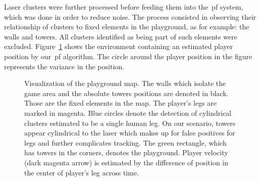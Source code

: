 Laser clusters were further processed before feeding them into the~\gls{pf} system, which was done in order to reduce noise. The process consisted in observing their relationship of clusters to fixed elements in the playground, as for example: the walls and towers. All clusters identified as being part of such elements were excluded. Figure~\ref{fig:laser_tracking} shows the environment containing an estimated player position by our~\gls{pf} algorithm. The circle around the player position in the figure represents the variance in the position.

\begin{figure}[h]
    \centering 
    \caption{Visualization of the playground map. The walls which isolate the game area and the absolute towers positions are denoted in black. Those are the fixed elements in the map. The player's legs are marked in magenta. Blue circles denote the detection of cylindrical clusters estimated to be a single human leg. On our scenario, towers appear cylindrical to the laser which makes up for false positives for legs and further complicates tracking. The green rectangle, which has towers in the corners, denotes the playground. Player velocity (dark magenta arrow) is estimated by the difference of position in the center of player's leg across time.}
    \label{fig:laser_tracking}
\end{figure}

